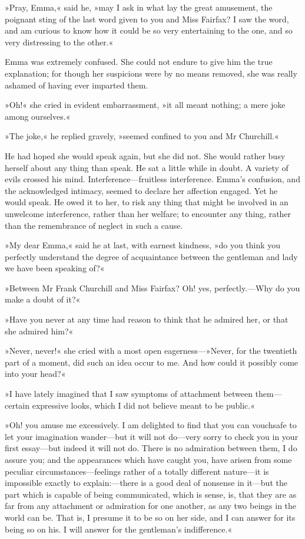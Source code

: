 »Pray, Emma,« said he, »may I ask in what lay the great amusement, the poignant sting of the last word given to you and Miss Fairfax? I saw the word, and am curious to know how it could be so very entertaining to the one, and so very distressing to the other.«

Emma was extremely confused. She could not endure to give him the true explanation; for though her suspicions were by no means removed, she was really ashamed of having ever imparted them.

»Oh!« she cried in evident embarrassment, »it all meant nothing; a mere joke among ourselves.«

»The joke,« he replied gravely, »seemed confined to you and Mr Churchill.«

He had hoped she would speak again, but she did not. She would rather busy herself about any thing than speak. He sat a little while in doubt. A variety of evils crossed his mind. Interference—fruitless interference. Emma's confusion, and the acknowledged intimacy, seemed to declare her affection engaged. Yet he would speak. He owed it to her, to risk any thing that might be involved in an unwelcome interference, rather than her welfare; to encounter any thing, rather than the remembrance of neglect in such a cause.

»My dear Emma,« said he at last, with earnest kindness, »do you think you perfectly understand the degree of acquaintance between the gentleman and lady we have been speaking of?«

»Between Mr Frank Churchill and Miss Fairfax? Oh! yes, perfectly.—Why do you make a doubt of it?«

»Have you never at any time had reason to think that he admired her, or that she admired him?«

»Never, never!« she cried with a most open eagerness—»Never, for the twentieth part of a moment, did such an idea occur to me. And how could it possibly come into your head?«

»I have lately imagined that I saw symptoms of attachment between them—certain expressive looks, which I did not believe meant to be public.«

»Oh! you amuse me excessively. I am delighted to find that you can vouchsafe to let your imagination wander—but it will not do—very sorry to check you in your first essay—but indeed it will not do. There is no admiration between them, I do assure you; and the appearances which have caught you, have arisen from some peculiar circumstances—feelings rather of a totally different nature—it is impossible exactly to explain:—there is a good deal of nonsense in it—but the part which is capable of being communicated, which is sense, is, that they are as far from any attachment or admiration for one another, as any two beings in the world can be. That is, I presume it to be so on her side, and I can answer for its being so on his. I will answer for the gentleman's indifference.«

